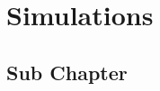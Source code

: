 \section{Simulations}
\label{sec: Chapter 4}
\lipsum[4]

\subsection{Sub Chapter}
\label{sec: sub chapter in chapter 4}
\lipsum[5]


